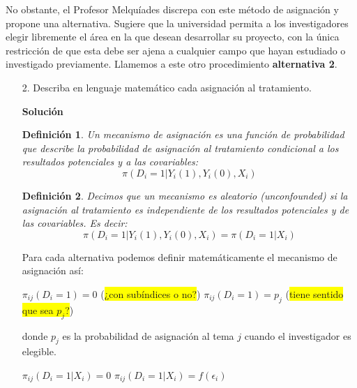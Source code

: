 \documentclass[a4paper, answers, addpoints, 11pt]{exam}
\newtheorem{definition}{Definición}
\newenvironment{solucion}{%
  \begin{mdframed}[
    backgroundcolor=blue!5,    %
    linecolor=blue!50,          %
    linewidth=2pt,              %
    leftmargin=10pt,            %
    rightmargin=10pt,           %
    topline=true,              %
    bottomline=true,            %
    roundcorner=10pt,           %
    innerleftmargin=10pt,       %
    innerrightmargin=10pt,      %
    innerbottommargin=10pt,     %
    innertopmargin=10pt         %
  ]%
  \begin{tcolorbox}[colframe=blue!50!black, colback=blue!50, coltitle=white, sharp corners=all, boxrule=1mm, width=\textwidth, halign=left, valign=center, top=0mm, bottom=0mm, left=0mm, right=0mm] \textbf{Solución} \end{tcolorbox} }{\end{mdframed}}
\begin{document}
No obstante, el Profesor Melquíades discrepa con este método de asignación y propone una alternativa. Sugiere que la universidad permita a los investigadores elegir libremente el área en la que desean desarrollar su proyecto, con la única restricción de que esta debe ser ajena a cualquier campo que hayan estudiado o investigado previamente. Llamemos a este otro procedimiento \textbf{alternativa 2}.

\bigskip
\begin{itemize}
    \item[2.] Describa en lenguaje matemático cada asignación al tratamiento.
    \begin{solucion}
       \begin{definition}
    Un mecanismo de asignación es una función de probabilidad que describe la probabilidad de asignación al tratamiento condicional a los resultados potenciales y a las covariables:
    $$\pi(D_i = 1 | Y_i(1), Y_i(0), X_i)$$
\end{definition}

\begin{definition}
    Decimos que un mecanismo es aleatorio (\textit{unconfounded}) si la asignación al tratamiento es independiente de los resultados potenciales y de las covariables. Es decir:
    $$\pi(D_i = 1 | Y_i(1), Y_i(0), X_i) = \pi(D_i = 1 | X_i)$$
\end{definition}


Para cada alternativa podemos definir matemáticamente el mecanismo de asignación así:

\begin{algorithm}
\caption{Alternativa 1}
\begin{algorithmic}
            \STATE $\pi_{ij}(D_i = 1) = 0$ (\colorbox{yellow}{¿con subíndices o no?})
        \ELSE
            \STATE $\pi_{ij}(D_i = 1) = p_j$ (\colorbox{yellow}{tiene sentido que sea $p_j$?})
        \ENDIF
    \ENDFOR
\ENDFOR
\end{algorithmic}
\end{algorithm}

donde $p_j$ es la probabilidad de asignación al tema $j$ cuando el investigador es elegible.

\begin{algorithm}
\caption{Alternativa 2}
\begin{algorithmic}
            \STATE $\pi_{ij}(D_i = 1 | X_i) = 0$
        \ELSE
            \STATE $\pi_{ij}(D_i = 1 | X_i) = f(\epsilon_i)$
        \ENDIF
    \ENDFOR
\ENDFOR
\end{algorithmic}
\end{algorithm}


\end{solucion}
\end{itemize}
\end{document}
